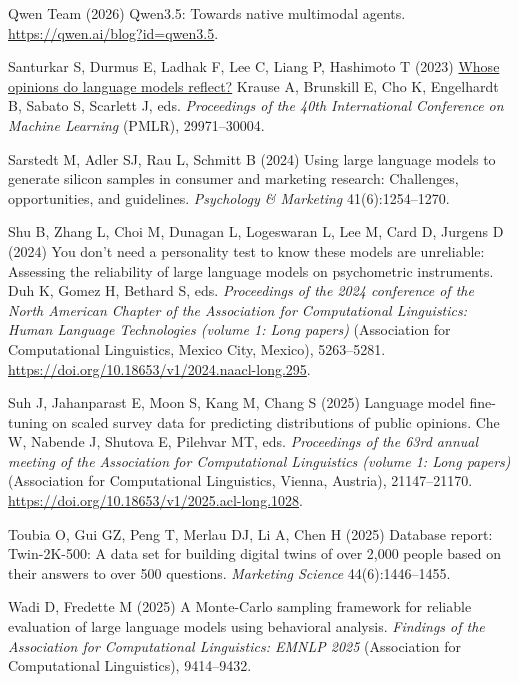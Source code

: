 \documentclass[
  letterpaper,
  DIV=11,
  numbers=noendperiod]{scrartcl}
\newlength{\cslhangindent}
\newenvironment{CSLReferences}[2] %
 {\begin{list}{}{%
  \setlength{\itemindent}{0pt}
  \setlength{\leftmargin}{0pt}
  \setlength{\parsep}{0pt}
  \ifodd #1
   \setlength{\leftmargin}{\cslhangindent}
   \setlength{\itemindent}{-1\cslhangindent}
  \fi
  \setlength{\itemsep}{#2\baselineskip}}}
 {\end{list}}
\begin{document}
\begin{CSLReferences}{1}{0}
Qwen Team (2026) {Qwen3.5}: Towards native multimodal agents.
\url{https://qwen.ai/blog?id=qwen3.5}.

Santurkar S, Durmus E, Ladhak F, Lee C, Liang P, Hashimoto T (2023)
\href{https://proceedings.mlr.press/v202/santurkar23a.html}{Whose
opinions do language models reflect?} Krause A, Brunskill E, Cho K,
Engelhardt B, Sabato S, Scarlett J, eds. \emph{Proceedings of the 40th
{International Conference on Machine Learning}} (PMLR), 29971--30004.

Sarstedt M, Adler SJ, Rau L, Schmitt B (2024) Using large language
models to generate silicon samples in consumer and marketing research:
Challenges, opportunities, and guidelines. \emph{Psychology \&
Marketing} 41(6):1254--1270.

Shu B, Zhang L, Choi M, Dunagan L, Logeswaran L, Lee M, Card D, Jurgens
D (2024) You don{'}t need a personality test to know these models are
unreliable: Assessing the reliability of large language models on
psychometric instruments. Duh K, Gomez H, Bethard S, eds.
\emph{Proceedings of the 2024 conference of the {North American Chapter
of the Association for Computational Linguistics}: {Human Language
Technologies} (volume 1: Long papers)} (Association for Computational
Linguistics, Mexico City, Mexico), 5263--5281.
\url{https://doi.org/10.18653/v1/2024.naacl-long.295}.

Suh J, Jahanparast E, Moon S, Kang M, Chang S (2025) Language model
fine-tuning on scaled survey data for predicting distributions of public
opinions. Che W, Nabende J, Shutova E, Pilehvar MT, eds.
\emph{Proceedings of the 63rd annual meeting of the {A}ssociation for
{C}omputational {L}inguistics (volume 1: Long papers)} (Association for
Computational Linguistics, Vienna, Austria), 21147--21170.
\url{https://doi.org/10.18653/v1/2025.acl-long.1028}.

Toubia O, Gui GZ, Peng T, Merlau DJ, Li A, Chen H (2025) Database
report: {Twin-2K-500}: A data set for building digital twins of over
2,000 people based on their answers to over 500 questions.
\emph{Marketing Science} 44(6):1446--1455.

Wadi D, Fredette M (2025) A {Monte-Carlo} sampling framework for
reliable evaluation of large language models using behavioral analysis.
\emph{Findings of the {Association for Computational Linguistics}:
{EMNLP} 2025} (Association for Computational Linguistics), 9414--9432.


\end{CSLReferences}
\end{document}
